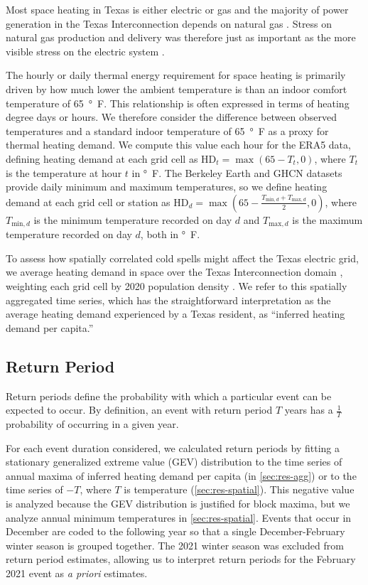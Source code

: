 \documentclass[12pt]{iopart}
\begin{document}
Most space heating in Texas is either electric or gas \cite{waite_heating:2020} and the majority of power generation in the Texas Interconnection depends on natural gas \cite{everhart_iea:2021}.
Stress on natural gas production and delivery was therefore just as important as the more visible stress on the electric system \cite{ercotpublic_outagesv2:2021}.

The hourly or daily thermal energy requirement for space heating is primarily driven by how much lower the ambient temperature is than an indoor comfort temperature of \SI{65}{\degree F}.
This relationship is often expressed in terms of heating degree days or hours.
We therefore consider the difference between observed temperatures and a standard indoor temperature of \SI{65}{\degree F} as a proxy for thermal heating demand.
We compute this value each hour for the ERA5 data, defining heating demand at each grid cell as $\text{HD}_t = \max (65 - T_t, 0)$, where $T_t$ is the temperature at hour $t$ in \si{\degree F}.
The Berkeley Earth and GHCN datasets provide daily minimum and maximum temperatures, so we define heating demand at each grid cell or station as $\text{HD}_d = \max (65 -\frac{T_{\text{min},d} + T_{\text{max},d}}{2}, 0)$, where $T_{\text{min},d}$ is the minimum temperature recorded on day $d$ and $T_{\text{max},d}$ is the maximum temperature recorded on day $d$, both in \si{\degree F}.

To assess how spatially correlated cold spells might affect the Texas electric grid, we average heating demand in space over the Texas Interconnection domain \cite{useia_regions:2021}, weighting each grid cell by 2020 population density \cite{ciesin_gpwv4:2016}.
We refer to this spatially aggregated time series, which has the straightforward interpretation as the average heating demand experienced by a Texas resident, as ``inferred heating demand per capita.''

\subsection{Return Period}

Return periods define the probability with which a particular event can be expected to occur.
By definition, an event with return period $T$ years has a $\frac{1}{T}$ probability of occurring in a given year.

For each event duration considered, we calculated return periods by fitting a stationary generalized extreme value (GEV) distribution to the time series of annual maxima of inferred heating demand per capita (in \cref{sec:res-agg}) or to the time series of $-T$, where $T$ is temperature (\cref{sec:res-spatial}).
This negative value is analyzed because the GEV distribution is justified for block maxima, but we analyze annual minimum temperatures in \cref{sec:res-spatial}.
Events that occur in December are coded to the following year so that a single December-February winter season is grouped together.
The 2021 winter season was excluded from return period estimates, allowing us to interpret return periods for the February 2021 event as \emph{a priori} estimates.
\end{document}
